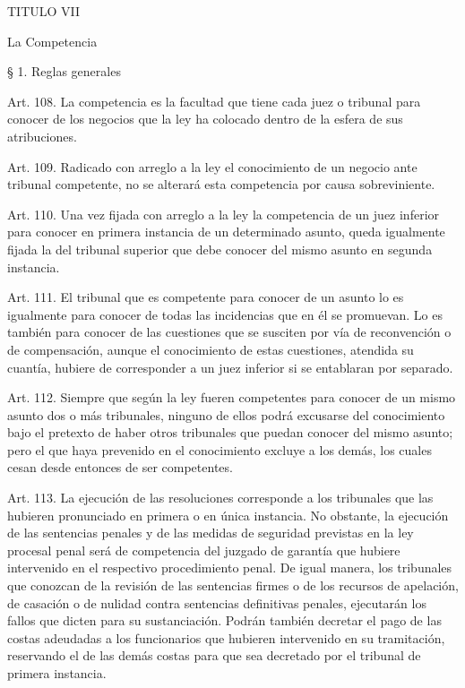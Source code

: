     TITULO VII

    La Competencia


    § 1. Reglas generales


    Art. 108. La competencia es la facultad que tiene cada juez o tribunal para conocer de los negocios que la ley ha colocado dentro de la esfera de sus atribuciones.


    Art. 109. Radicado con arreglo a la ley el conocimiento de un negocio ante tribunal competente, no se alterará esta competencia por causa sobreviniente.


    Art. 110. Una vez fijada con arreglo a la ley la competencia de un juez inferior para conocer en primera instancia de un determinado asunto, queda igualmente fijada la del tribunal superior que debe conocer del mismo asunto en segunda instancia.


    Art. 111. El tribunal que es competente para conocer de un asunto lo es igualmente para conocer de todas las incidencias que en él se promuevan.
    Lo es también para conocer de las cuestiones que se susciten por vía de reconvención o de compensación, aunque el conocimiento de estas cuestiones, atendida su cuantía, hubiere de corresponder a un juez inferior si se entablaran por separado.



    Art. 112. Siempre que según la ley fueren competentes para conocer de un mismo asunto dos o más tribunales, ninguno de ellos podrá excusarse del conocimiento bajo el pretexto de haber otros tribunales que puedan conocer del mismo asunto; pero el que haya prevenido en el conocimiento excluye a los demás, los cuales cesan desde entonces de ser competentes.


    Art. 113. La ejecución de las resoluciones corresponde a los tribunales que las hubieren pronunciado en primera o en única instancia.
    No obstante, la ejecución de las sentencias penales y de las medidas de seguridad previstas en la ley procesal penal será de competencia del juzgado de garantía que hubiere intervenido en el respectivo procedimiento penal.
    De igual manera, los tribunales que conozcan de la revisión de las sentencias firmes o de los recursos de apelación, de casación o de nulidad contra sentencias definitivas penales, ejecutarán los fallos que dicten para su sustanciación.
    Podrán también decretar el pago de las costas adeudadas a los funcionarios que hubieren intervenido en su tramitación, reservando el de las demás costas para que sea decretado por el tribunal de primera instancia.



